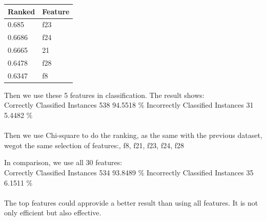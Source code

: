 \documentclass[11pt, a4paper, oneside, openright]{article}
\begin{document}
\begin{table}[H]
\begin{tabular}{|l|l|}
\hline
\multicolumn{1}{|c|}{\textbf{Ranked}} & \multicolumn{1}{c|}{\textbf{Feature}} \\
\hline
0.685    &f23                                     \\
\hline
0.6686    &f24                                \\
\hline
0.6665  &21                                             \\
\hline
0.6478   &f28                                             \\
\hline
0.6347   &f8                                            \\
\hline
\end{tabular}
\end{table}

Then we use these 5 features in classification.
The result shows:
\\
\newline Correctly Classified Instances    \hspace * {4mm}     538    \hspace * {4mm}           94.5518 \%
\newline Incorrectly Classified Instances  \hspace * {4mm}      31     \hspace * {4mm}           5.4482 \%
\\
\\
Then we use Chi-square to do the ranking, as the same with the previous dataset, wegot the same selection of features:, f8, f21, f23, f24, f28


In comparison, we use all 30 features:
\\
\newline Correctly Classified Instances    \hspace * {4mm}     534      \hspace * {4mm}         93.8489 \%
\newline Incorrectly Classified Instances   \hspace * {4mm}     35       \hspace * {4mm}         6.1511 \%
\\
\\
The top features could approvide a better result than using all features. It is not only efficient but also effective.
\end{document}
